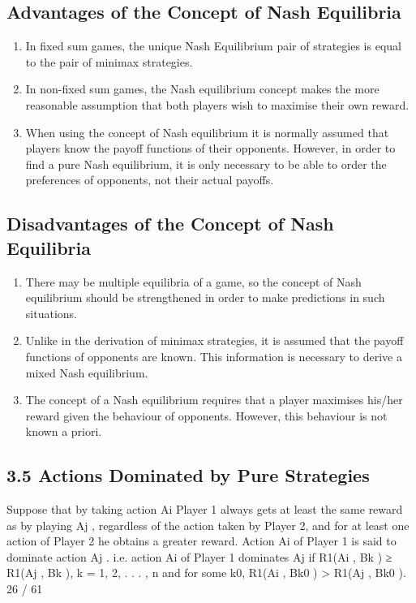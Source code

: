 \documentclass[]{report}
\begin{document}
\subsection{Advantages of the Concept of Nash Equilibria}
\begin{enumerate}
	\item  In fixed sum games, the unique Nash Equilibrium pair
	of strategies is equal to the pair of minimax
	strategies.
	\item  In non-fixed sum games, the Nash equilibrium
	concept makes the more reasonable assumption that
	both players wish to maximise their own reward.
	\item  When using the concept of Nash equilibrium it is
	normally assumed that players know the payoff
	functions of their opponents. However, in order to
	find a pure Nash equilibrium, it is only necessary to
	be able to order the preferences of opponents, not
	their actual payoffs.
\end{enumerate}

\subsection{Disadvantages of the Concept of Nash Equilibria}
\begin{enumerate}
	\item There may be multiple equilibria of a game, so the
	concept of Nash equilibrium should be strengthened
	in order to make predictions in such situations.
	\item Unlike in the derivation of minimax strategies, it is
	assumed that the payoff functions of opponents are
	known. This information is necessary to derive a
	mixed Nash equilibrium.
	\item  The concept of a Nash equilibrium requires that a
	player maximises his/her reward given the behaviour
	of opponents. However, this behaviour is not known
	a priori.
\end{enumerate}

\subsection{3.5 Actions Dominated by Pure Strategies}
Suppose that by taking action Ai Player 1 always gets at least the
same reward as by playing Aj
, regardless of the action taken by
Player 2, and for at least one action of Player 2 he obtains a
greater reward. Action Ai of Player 1 is said to dominate action Aj
.
i.e. action Ai of Player 1 dominates Aj
if
R1(Ai
, Bk ) ≥ R1(Aj
, Bk ), k = 1, 2, . . . , n
and for some k0, R1(Ai
, Bk0
) > R1(Aj
, Bk0
).
26 / 61
\end{document}

